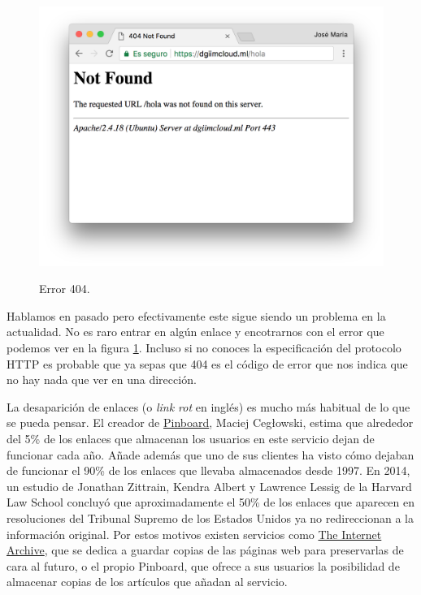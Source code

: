 \documentclass[12pt]{article} %
\begin{document}
\begin{figure}[h]
\includegraphics[width=\textwidth]{404}
\label{fig:404}
\caption{Error 404.}
\end{figure}

Hablamos en pasado pero efectivamente este sigue siendo un problema en la actualidad. No es raro entrar en algún enlace y encotrarnos con el error que podemos ver en la figura \ref{fig:404}. Incluso si no conoces la especificación del protocolo HTTP es probable que ya sepas que 404 es el código de error que nos indica que no hay nada que ver en una dirección.

La desaparición de enlaces (o \textit{link rot} en inglés) es mucho más habitual de lo que se pueda pensar. El creador de \href{pinboard.in}{Pinboard}, Maciej Cegłowski, estima que alrededor del 5\% de los enlaces que almacenan los usuarios en este servicio dejan de funcionar cada año\cite{pinboard-dead-links}. Añade además que uno de sus clientes ha visto cómo dejaban de funcionar el 90\% de los enlaces que llevaba almacenados desde 1997. En 2014, un estudio de Jonathan Zittrain, Kendra Albert y Lawrence Lessig de la Harvard Law School concluyó que aproximadamente el 50\% de los enlaces que aparecen en resoluciones del Tribunal Supremo de los Estados Unidos ya no redireccionan a la información original\cite{scotus-dead-links}. Por estos motivos existen servicios como \href{https://archive.org/}{The Internet Archive}, que se dedica a guardar copias de las páginas web para preservarlas de cara al futuro, o el propio Pinboard, que ofrece a sus usuarios la posibilidad de almacenar copias de los artículos que añadan al servicio.
\end{document}
